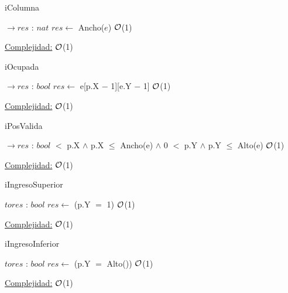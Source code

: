 \begin{Representacion}
\begin{Algoritmos}
	\begin{algorithm}
		\caption{iColumna}
		\begin{algorithmic}
			 $\to res$ : $nat$
				\State $res \gets$ Ancho($e$) \Comment $\mathcal{O}$(1)
			\EndProcedure		
		\end{algorithmic}
		\underline{Complejidad:} $\mathcal{O}$(1)
	\end{algorithm}
	
	\begin{algorithm}
		\caption{iOcupada}
		\begin{algorithmic}
			 $\to res$ : $bool$	
				\State $res \gets$ e[p.X $-$ 1][e.Y $-$ 1] \Comment $\mathcal{O}$(1)
			\EndProcedure		
		\end{algorithmic}
		\underline{Complejidad:} $\mathcal{O}$(1)
	\end{algorithm}
	
	\begin{algorithm}
		\caption{iPosValida}
		\begin{algorithmic}
			 $\to res$ : $bool$
				 $<$ p.X $\land$ p.X $\leq$ Ancho(e) $\land$ 0 $<$ p.Y $\land$ p.Y $\leq$ Alto(e) \Comment $\mathcal{O}$(1)
			\EndProcedure		
		\end{algorithmic}
		\underline{Complejidad:} $\mathcal{O}$(1)
	\end{algorithm}

	\begin{algorithm}
		\caption{iIngresoSuperior}
		\begin{algorithmic}
			 $to res$ : $bool$
				\State $res \gets$ (p.Y $=$ 1) \Comment $\mathcal{O}$(1)		
			\EndProcedure		
		\end{algorithmic}
		\underline{Complejidad:} $\mathcal{O}$(1)
	\end{algorithm}
	
	\begin{algorithm}
		\caption{iIngresoInferior}
		\begin{algorithmic}
			 $to res$ : $bool$
				\State $res \gets$ (p.Y $=$ Alto()) \Comment $\mathcal{O}$(1)		
			\EndProcedure		
		\end{algorithmic}
		\underline{Complejidad:} $\mathcal{O}$(1)
	\end{algorithm}
	

\end{Algoritmos}
\end{Representacion}
